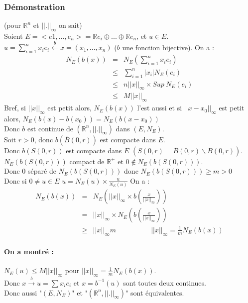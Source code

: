 \documentclass[a4paper, oneside]{report}
\newcommand{\x}{\times}
\newcommand{\R}{\mathbb{R}}
\newcommand{\fracun}[1]{\frac{1}{#1}}
\begin{document}
\subsubsection{Démonstration}
(pour $\R^n$ et $||.||_ \infty$ on sait)\\
Soient $E=<e1,...,e_n>=\R e_i \oplus ... \oplus \R e_n$, et $u\in E$.\\
$u = \sum_{i=1}^nx_ie_i \overset{b}{\leftarrow} x=(x_1,...,x_n)$ ($b$ une fonction bijective).
On a :
$$
\begin{array}{lll}
N_E(b(x))&=&N_E(\sum_{i=1}^nx_ie_i)\\
&\leq & \sum_{i=1}^n|x_i|N_E(e_i)\\
&\leq & n ||x||_\infty \x Sup~N_E(e_i)\\
&\leq & M ||x||_\infty
\end{array}$$
Bref, si $||x||_\infty$ est petit alors, $N_E(b(x))$ l'est aussi et si $||x-x_0||_\infty$ est petit alors, $N_E(b(x)-b(x_0)) = N_E(b(x - x_0))$\\
Donc $b$ est continue de $(\R^n, ||.||_\infty)$ dans $(E,N_E)$.\\
Soit $r>0$, donc $b(\bar{B}(0,r))$ est compacte dans $E$.\\
Donc $b(S(0,r))$ est compacte dans $E$ $(S(0,r) = \bar{B}(0,r)\backslash B(0,r))$.\\
$N_E(b(S(0,r)))$ compact de $\R^+$ et $0\notin N_E(b(S(0,r)))$.\\
Donc $0$ séparé de $N_E(b(S(0,r)))$ donc $N_E(b(S(0,r))) \geq m >0$\\
Donc si $0\neq u\in E$ $u=N_E(u)\x \frac{u}{N_E(u)}$
On a :
$$\begin{array}{lll}
N_E(b(x))&=&N_E(||x||_\infty\x b(\frac{x}{||x||_\infty}))\\
&=&||x||_\infty \x N_E(b(\frac{x}{||x||_\infty}))\\
&\geq& ||x||_\infty m\hspace{5em}||x||_\infty = \fracun{m}N_E(b(x))
\end{array}$$

\paragraph{On a montré :} 
$N_E(u) \leq M ||x||_\infty$ pour $||x||_\infty = \fracun{m}N_E(b(x))$.\\
Donc $x\overset{b}{\rightarrow} u= \sum x_ie_i$ et $x = b^{-1}(u)$ sont toutes deux continues.\\
Donc aussi "$(E,N_E)$" et  "$(\R^n,||.||_\infty)$" sont équivalentes.\\
\end{document}
